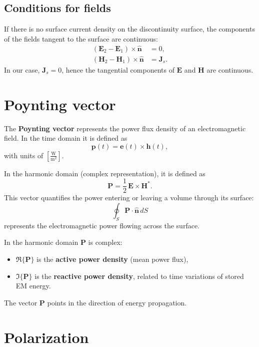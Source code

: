 \subsection*{Conditions for fields}
If there is no surface current density on the discontinuity surface,  
the components of the fields tangent to the surface are continuous:
\begin{align}
    (\mathbf{E}_2 - \mathbf{E}_1)\times\hat{\mathbf{n}} &= 0,\\
    (\mathbf{H}_2 - \mathbf{H}_1)\times\hat{\mathbf{n}} &= \mathbf{J}_s.
\end{align}
In our case, $\mathbf{J}_s=0$, hence the tangential components of $\mathbf{E}$ and $\mathbf{H}$ are continuous.

\section{Poynting vector}

The \textbf{Poynting vector} represents the power flux density of an electromagnetic field.  
In the time domain it is defined as
\begin{equation}
    \mathbf{p}(t) = \mathbf{e}(t)\times\mathbf{h}(t),
\end{equation}
with units of $\left[\tfrac{\text{W}}{\text{m}^2}\right]$.

In the harmonic domain (complex representation), it is defined as
\begin{equation}
    \mathbf{P} = \frac{1}{2}\,\mathbf{E}\times\mathbf{H}^*.
\end{equation}
This vector quantifies the power entering or leaving a volume through its surface:
\[
\oint_S \mathbf{P}\cdot\hat{\mathbf{n}}\,dS
\]
represents the electromagnetic power flowing across the surface.

\smallskip
In the harmonic domain $\mathbf{P}$ is complex:
\begin{itemize}
    \item $\Re\{\mathbf{P}\}$ is the \textbf{active power density} (mean power flux),
    \item $\Im\{\mathbf{P}\}$ is the \textbf{reactive power density}, related to time variations of stored EM energy.
\end{itemize}
The vector $\mathbf{P}$ points in the direction of energy propagation.

\section{Polarization}

